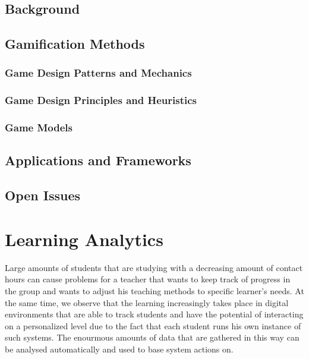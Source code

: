\documentclass[10pt]{article}
\begin{document}
\subsection{Background}


\subsection{Gamification Methods}

\subsubsection{Game Design Patterns and Mechanics}

\subsubsection{Game Design Principles and Heuristics}

\subsubsection{Game Models}


\subsection{Applications and Frameworks}


\subsection{Open Issues}


\section{Learning Analytics}
Large amounts of students that are studying with a decreasing amount of contact hours can cause problems for a teacher that wants to keep track of progress in the group and wants to adjust his teaching methods to specific learner's needs. At the same time, we observe that the learning increasingly takes place in digital environments that are able to track students and have the potential of interacting on a personalized level due to the fact that each student runs his own instance of such systems. The enourmous amounts of data that are gathered in this way can be analysed automatically and used to base system actions on.
\end{document}
